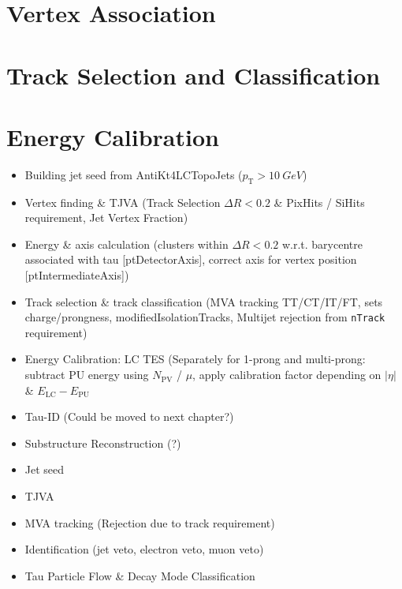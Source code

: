 
\section{Vertex Association}
\label{sec:reco_vertex_assoc}

\section{Track Selection and Classification}
\label{sec:reco_track_sel_classif}

\section{Energy Calibration}
\label{sec:reco_energy_calib}


\begin{itemize}
\item Building jet seed from AntiKt4LCTopoJets ($p_\mathrm{T} > \SI{10}{GeV}$)

\item Vertex finding \& TJVA (Track Selection $\Delta R < 0.2$ \& PixHits /
  SiHits requirement, Jet Vertex Fraction)

\item Energy \& axis calculation (clusters within $\Delta R < 0.2$ w.r.t.
  barycentre associated with tau [ptDetectorAxis], correct axis for vertex
  position [ptIntermediateAxis])

\item Track selection \& track classification (MVA tracking TT/CT/IT/FT, sets
  charge/prongness, modifiedIsolationTracks, Multijet rejection from
  \texttt{nTrack} requirement)

\item Energy Calibration: LC \textrightarrow TES (Separately for 1-prong and
  multi-prong: subtract PU energy using $N_\mathrm{PV}$ / $\mu$, apply
  calibration factor depending on $|\eta|$ \& $E_\mathrm{LC} - E_\mathrm{PU}$

\item Tau-ID (Could be moved to next chapter?)

\item Substructure Reconstruction (?)
\end{itemize}


\begin{itemize}
\item Jet seed
\item TJVA
\item MVA tracking (Rejection due to track requirement)
\item Identification (jet veto, electron veto, muon veto)
\item Tau Particle Flow \& Decay Mode Classification
\end{itemize}

\cite{atlas:taurec:run1}
\cite{atlas:taurec:run2}
\cite{atlas:taurec:decaymodes}

